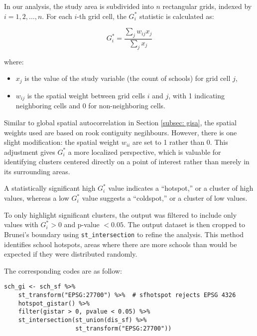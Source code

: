 \documentclass[12pt]{article}
\begin{document}
In our analysis, the study area is subdivided into $n$ rectangular grids, indexed by $i=1, 2, \ldots, n$. For each $i$-th grid cell, the $G_i^*$ statistic is calculated as:

\begin{equation}
G_i^* = \frac{\sum_j w_{ij} x_j}{\sum_j x_j}
\end{equation}

where:
\begin{itemize}
    \item $x_j$ is the value of the study variable (the count of schools) for grid cell $j$,
    \item $w_{ij}$ is the spatial weight between grid cells $i$ and $j$, with 1 indicating neighboring cells and 0 for non-neighboring cells.
\end{itemize}

Similar to global spatial autocorrelation in Section \ref{subsec: gisa}, the spatial weights used are based on rook contiguity negihbours. However, there is one slight modification: the spatial weight $w_{ii}$ are set to 1 rather than 0. This adjustment gives $G_i^*$ a more localized perspective, which is valuable for identifying clusters centered directly on a point of interest rather than merely in its surrounding areas.

A statistically significant high $G_i^*$ value indicates a “hotspot,” or a cluster of high values, whereas a low $G_i^*$ value suggests a “coldspot,” or a cluster of low values.

To only highlight significant clusters, the output was filtered to include only values with $G_i^* > 0$ and p-value $< 0.05$. The output dataset is then cropped to Brunei’s boundary using \texttt{st\_intersection} to refine the analysis. This method identifies school hotspots, areas where there are more schools than would be expected if they were distributed randomly. 

The corresponding codes are as follow:

\begin{tcolorbox}[title=Corresponding Codes]
\begin{verbatim}
sch_gi <- sch_sf %>% 
    st_transform("EPSG:27700") %>%  # sfhotspot rejects EPSG 4326 
    hotspot_gistar() %>%  
    filter(gistar > 0, pvalue < 0.05) %>% 
    st_intersection(st_union(dis_sf) %>% 
                    st_transform("EPSG:27700"))
\end{verbatim}
\end{tcolorbox}
\end{document}

